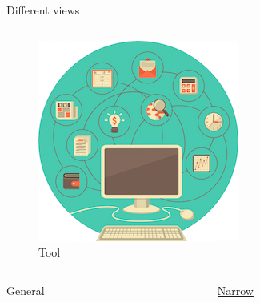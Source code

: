 \begin{frame}{Different views}
\begin{columns}
\begin{column}{.5\textwidth}
			\begin{figure}
				\includegraphics[width=.75\textwidth, center]{figures/WHU-lesson-6}
				\caption*{Tool}
			\end{figure}
		\end{column}
	\end{columns}
	\begin{columns}
		\begin{column}{.5\textwidth}
			\begin{center}
				General
			\end{center}
		\end{column}
		\begin{column}{.5\textwidth}
			\begin{center}
			\href{https://www.youtube.com/watch_popup?v=vIci3C4JkL0}{Narrow}	
			\end{center}
		\end{column}
	\end{columns}
\end{frame}




